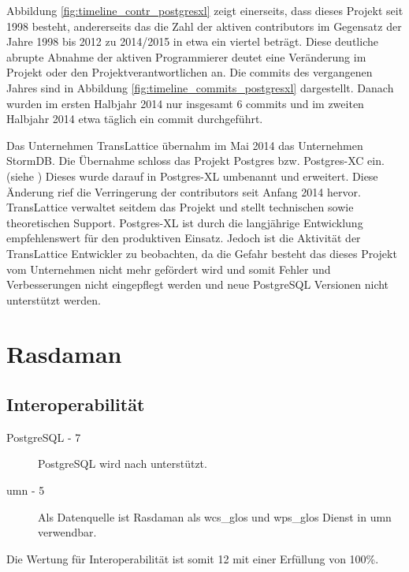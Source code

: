 Abbildung \ref{fig:timeline_contr_postgresxl} zeigt einerseits, dass dieses Projekt seit 1998 besteht, andererseits das die Zahl der aktiven contributors im Gegensatz der Jahre 1998 bis 2012 zu 2014/2015 in etwa ein viertel beträgt.
Diese deutliche abrupte Abnahme der aktiven Programmierer deutet eine Veränderung im Projekt oder den Projektverantwortlichen an.
Die commits des vergangenen Jahres sind in Abbildung \ref{fig:timeline_commits_postgresxl} dargestellt.
Danach wurden im ersten Halbjahr 2014 nur insgesamt 6 commits und im zweiten Halbjahr 2014 etwa täglich ein commit durchgeführt.

Das Unternehmen TransLattice übernahm im Mai 2014 das Unternehmen StormDB.
Die Übernahme schloss das Projekt Postgres bzw. Postgres-XC ein. (siehe \cite{website:translattice-stormdb})
Dieses wurde darauf in Postgres-XL umbenannt und erweitert.
Diese Änderung rief die Verringerung der contributors seit Anfang 2014 hervor.
TransLattice verwaltet seitdem das Projekt und stellt technischen sowie theoretischen Support.
Postgres-XL ist durch die langjährige Entwicklung empfehlenswert für den produktiven Einsatz.
Jedoch ist die Aktivität der TransLattice Entwickler zu beobachten, da die Gefahr besteht das dieses Projekt vom Unternehmen nicht mehr gefördert wird und somit Fehler und Verbesserungen nicht eingepflegt werden und neue PostgreSQL Versionen nicht unterstützt werden.


\section{Rasdaman}

\subsection{Interoperabilität}
\begin{description}
\item[PostgreSQL - 7] PostgreSQL wird nach \cite{website:rasdaman-features} unterstützt.
\item[\Gls{umn} - 5] Als Datenquelle ist Rasdaman als \Gls{wcs_glos} und \Gls{wps_glos} Dienst in \Gls{umn} verwendbar.
\end{description}
Die Wertung für Interoperabilität ist somit 12 mit einer Erfüllung von 100\%.

